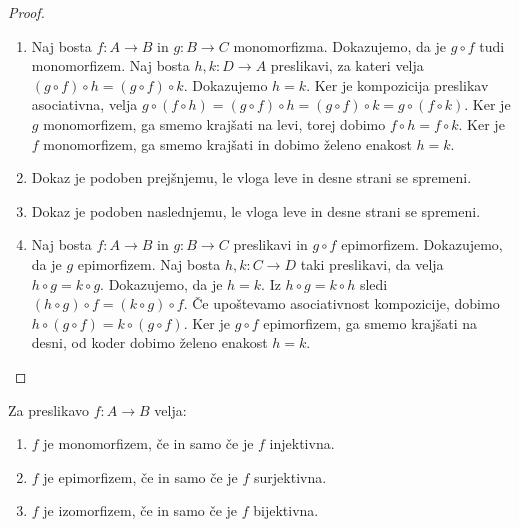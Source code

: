 \begin{proof}
  \begin{enumerate}
  \item Naj bosta $f : A \to B$ in $g : B \to C$ monomorfizma. Dokazujemo, da je
    $g \circ f$ tudi monomorfizem. Naj bosta $h, k : D \to A$ preslikavi, za kateri velja
    $(g \circ f) \circ h = (g \circ f) \circ k$. Dokazujemo $h = k$. Ker je kompozicija
    preslikav asociativna, velja
    $g \circ (f \circ h) = (g \circ f) \circ h = (g \circ f) \circ k = g \circ (f \circ k)$.
    Ker je $g$ monomorfizem, ga smemo krajšati na levi, torej dobimo
    $f \circ h = f \circ k$. Ker je $f$ monomorfizem, ga smemo krajšati in dobimo želeno
    enakost $h = k$.

  \item Dokaz je podoben prejšnjemu, le vloga leve in desne strani se spremeni.

  \item Dokaz je podoben naslednjemu, le vloga leve in desne strani se spremeni.

  \item Naj bosta $f : A \to B$ in $g : B \to C$ preslikavi in $g \circ f$ epimorfizem.
    Dokazujemo, da je $g$ epimorfizem. Naj bosta $h, k : C \to D$ taki preslikavi, da
    velja $h \circ g = k \circ g$. Dokazujemo, da je $h = k$. Iz $h \circ g = k \circ h$
    sledi $(h \circ g) \circ f = (k \circ g) \circ f$. Če upoštevamo asociativnost
    kompozicije, dobimo $h \circ (g \circ f) = k \circ (g \circ f)$. Ker je $g \circ f$
    epimorfizem, ga smemo krajšati na desni, od koder dobimo želeno enakost $h = k$.
  \end{enumerate}
\end{proof}

\begin{izrek}
  Za preslikavo $f : A \to B$ velja:
  \begin{enumerate}
  \item $f$ je monomorfizem, če in samo če je $f$ injektivna.
  \item $f$ je epimorfizem, če in samo če je $f$ surjektivna.
  \item $f$ je izomorfizem, če in samo če je $f$ bijektivna.
  \end{enumerate}
\end{izrek}



